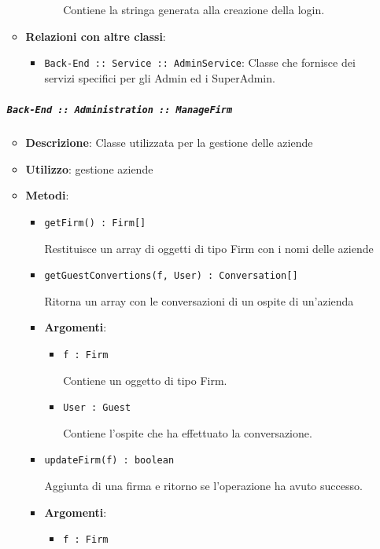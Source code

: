 \documentclass[../DefinizioneDiProdotto.tex]{subfiles}
\begin{document}
\begin{itemize}
\begin{itemize}
\begin{itemize}
\begin{itemize}
	 Contiene la stringa generata alla creazione della login.
	\end{itemize}
	\end{itemize}\vspace{0.5em}
	\item \textbf{Relazioni con altre classi}:
	\begin{itemize}
	\item \texttt{Back-End :: Service :: AdminService}: Classe che fornisce dei servizi specifici per gli Admin ed i SuperAdmin.
	\end{itemize}
	\end{itemize}\subparagraph{\texttt{Back-End :: Administration :: ManageFirm}}
	\begin{itemize}\item \textbf{Descrizione}: Classe utilizzata per la gestione delle aziende
	\item \textbf{Utilizzo}: gestione aziende
	\item \textbf{Metodi}:
	\begin{itemize}
	\item \texttt{getFirm() : Firm[]}\

	 Restituisce un array di oggetti di tipo Firm con i nomi delle aziende
	\end{itemize}\vspace{0.5em}
	\begin{itemize}
	\item \texttt{getGuestConvertions(f, User) : Conversation[]}\

	 Ritorna un array con le conversazioni di un ospite di un'azienda

	\item \textbf{Argomenti}:
	\begin{itemize}
	\item \texttt{f : Firm}\

	 Contiene un oggetto di tipo Firm.
	\item \texttt{User : Guest}\

	 Contiene l'ospite che ha effettuato la conversazione.
	\end{itemize}
	\end{itemize}\vspace{0.5em}
	\begin{itemize}
	\item \texttt{updateFirm(f) : boolean}\

	 Aggiunta di una firma e ritorno se l'operazione ha avuto successo.

	\item \textbf{Argomenti}:
	\begin{itemize}
	\item \texttt{f : Firm}\


\end{itemize}
\end{itemize}
\end{itemize}
\end{itemize}
\end{document}
